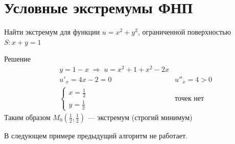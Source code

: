 \author{Andrei Tkachuk}

\section{Условные экстремумы ФНП}

\begin{Example}
    Найти экстремум для функции $u = x^2 + y^2$, ограниченной поверхностью $S: x + y = 1$\\
    \begin{figure}[h!]
        \noindent{}
    \end{figure}

    Решение
    \begin{align*}
        &y = 1 - x \; \Rightarrow \; u = x^2 + 1 + x^2 - 2x\\
        &u'_x = 4x - 2 = 0 &u''_x = 4 > 0\\
        &\begin{cases} 
                x = \frac{1}{2}\\
                y = \frac{1}{2}
        \end{cases} & \text{точек нет}
    \end{align*}
    Таким образом $M_0(\frac{1}{2}, \frac{1}{2})$ --- экстремум (строгий минимум)
\end{Example}
    В следующем примере предыдущий алгоритм не работает.
